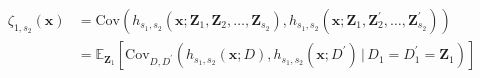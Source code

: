\documentclass[letterpaper,10pt]{article}
\numberwithin{equation}{section}
\numberwithin{thm}{section}
\numberwithin{lem}{section}
\numberwithin{cor}{section}
\newcommand{\E}{\mathbb{E}}
\newcommand{\1}{\mathbbm{1}}
\newcommand{\Cov}{\text{Cov}}
\begin{document}
\begin{equation}
	\begin{aligned}
		\zeta_{1,s_2}\left(\mathbf{x}\right)
		 & = \Cov\left(
		h_{s_1, s_2}\left(\mathbf{x}; \mathbf{Z}_1, \mathbf{Z}_2, \ldots, \mathbf{Z}_{s_2}\right),
		h_{s_1, s_2}\left(\mathbf{x}; \mathbf{Z}_1, \mathbf{Z}_{2}^{\prime}, \ldots, \mathbf{Z}_{s_2}^{\prime}\right)
		\right)                      \\
		 & = \E_{\mathbf{Z}_1}\left[
			\Cov_{D, D^\prime}\left(
			h_{s_1, s_2}\left(\mathbf{x}; D\right),
			h_{s_1, s_2}\left(\mathbf{x}; D^{\prime}\right)
			\, | \, D_1 = D_{1}^{\prime} = \mathbf{Z}_1
			\right)
			\right]
	\end{aligned}
\end{equation}
\end{document}
